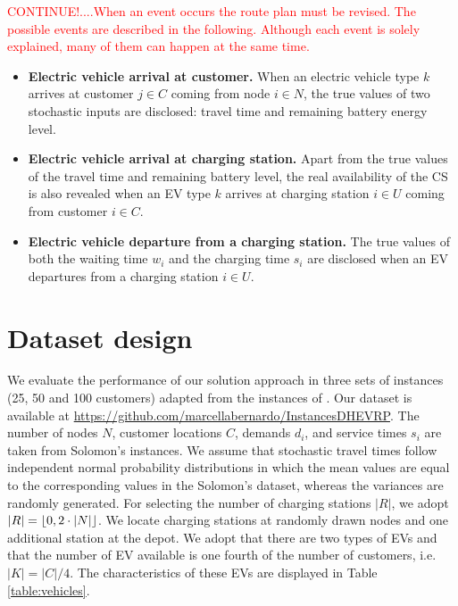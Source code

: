\documentclass[11pt]{article}
\DeclarePairedDelimiter\floor{\lfloor}{\rfloor}
\begin{document}
\textcolor{red}{CONTINUE!....When an event occurs the route plan must be revised. The possible events are described in the following. Although each event is solely explained, many of them can happen at the same time.}

\begin{itemize}
\item \textbf{Electric vehicle arrival at customer.} 
When an electric vehicle type $k$ arrives at customer $j \in C$ coming from node $i \in N$, the true values of two stochastic inputs are disclosed: travel time and remaining battery energy level.
\item \textbf{Electric vehicle arrival at charging station.}
Apart from the true values of the travel time and remaining battery level, the real availability of the CS is also revealed when an EV type $k$ arrives at charging station $i \in U$ coming from customer $i \in C$. 
\item \textbf{Electric vehicle departure from a charging station.}
The true values of both the waiting time $w_i$ and the charging time $s_i$ are disclosed when an EV departures from a charging station $i \in U$. 
\end{itemize}

\section{Dataset design}
\label{section:dataset}
We evaluate the performance of our solution approach in three sets of instances (25, 50 and 100 customers) adapted from the instances of \cite{Solomon1987}. Our dataset is available at \url{https://github.com/marcellabernardo/InstancesDHEVRP}. The number of nodes $N$, customer locations $C$, demands $d_i$, and service times $s_i$ are taken from Solomon's instances. We assume that stochastic travel times follow independent normal probability distributions in which the mean values are equal to the corresponding values in the Solomon's dataset, whereas the variances are randomly generated. For selecting the number of charging stations $|R|$, we adopt $|R| = \floor{0,2 \cdot |N|}$. We locate charging stations at randomly drawn nodes and one additional station at the depot. We adopt that there are two types of EVs and that the number of EV available is one fourth of the number of customers, i.e. $|K| = |C|/4$. The characteristics of these EVs are displayed in Table \ref{table:vehicles}.
\end{document}
